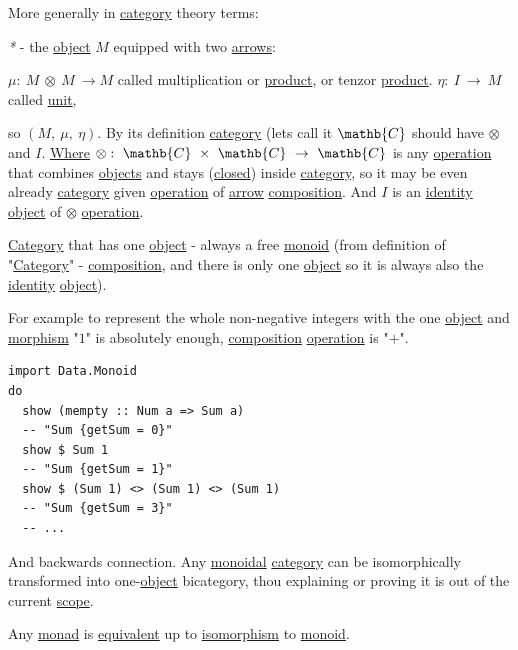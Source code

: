\documentclass[a4paper,14pt,oneside]{book}
\begin{document}
More generally in \hyperref[org42f63ac]{category} theory terms:

\emph{*} - the \hyperref[org59945ae]{object} \(M\) equipped with two \hyperref[org8d28f76]{arrows}:

\(\mu: \ M \ \otimes \ M \ \to M\) called multiplication or \hyperref[org3822a60]{product}, or tenzor \hyperref[org3822a60]{product}.
\(\eta: \ I \ \to \ M\) called \hyperref[org5acb2fe]{unit},

so \((M, \ \mu, \ \eta )\). By its definition \hyperref[org42f63ac]{category} (lets call it \(\mathb{C}\) should have \(\otimes\) and \(I\). \hyperref[orgd843ffe]{Where} \(\otimes: \ \mathb{C} \ \times \ \mathb{C} \ \to \ \mathb{C}\) is any \hyperref[org0f0efbc]{operation} that combines \hyperref[org07ba60b]{objects} and stays (\hyperref[orgc3d76b5]{closed}) inside \hyperref[org42f63ac]{category}, so it may be even already \hyperref[org42f63ac]{category} given \hyperref[org0f0efbc]{operation} of \hyperref[org33124e1]{arrow} \hyperref[org6f33daa]{composition}. And \(I\) is an \hyperref[org931538d]{identity} \hyperref[org59945ae]{object} of \(\otimes\) \hyperref[org0f0efbc]{operation}.

\hyperref[org42f63ac]{Category} that has one \hyperref[org59945ae]{object} - always a free \hyperref[org2993534]{monoid} (from definition of "\hyperref[org42f63ac]{Category}" - \hyperref[org6f33daa]{composition}, and there is only one \hyperref[org59945ae]{object} so it is always also the \hyperref[org931538d]{identity} \hyperref[org59945ae]{object}).

For example to represent the whole non-negative integers with the one \hyperref[org59945ae]{object} and \hyperref[org7b946a3]{morphism} "\(1\)" is absolutely enough, \hyperref[org6f33daa]{composition} \hyperref[org0f0efbc]{operation} is "\(+\)".

\begin{verbatim}
import Data.Monoid
do
  show (mempty :: Num a => Sum a)
  -- "Sum {getSum = 0}"
  show $ Sum 1
  -- "Sum {getSum = 1}"
  show $ (Sum 1) <> (Sum 1) <> (Sum 1)
  -- "Sum {getSum = 3}"
  -- ...
\end{verbatim}

And backwards connection.
Any \hyperref[org1bd8c20]{monoidal} \hyperref[org42f63ac]{category} can be isomorphically transformed into one-\hyperref[org59945ae]{object} bicategory, thou explaining or proving it is out of the current \hyperref[org4aa60f7]{scope}.

Any \hyperref[org2c56c71]{monad} is \hyperref[org189f7c6]{equivalent} up to \hyperref[orgcbce883]{isomorphism} to \hyperref[org2993534]{monoid}.
\end{document}
